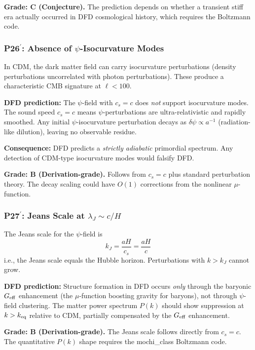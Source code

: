 \documentclass[11pt]{article}
\begin{document}
\textbf{Grade: C (Conjecture).}  The prediction depends on whether
a transient stiff era actually occurred in DFD cosmological history,
which requires the Boltzmann code.

\subsubsection{P26$^\prime$: Absence of $\psi$-Isocurvature Modes}

In CDM, the dark matter field can carry isocurvature perturbations
(density perturbations uncorrelated with photon perturbations).
These produce a characteristic CMB signature at $\ell < 100$.

\textbf{DFD prediction:} The $\psi$-field with $c_s = c$ does
\emph{not} support isocurvature modes.  The sound speed $c_s = c$
means $\psi$-perturbations are ultra-relativistic and
rapidly smoothed.  Any initial $\psi$-isocurvature perturbation
decays as $\delta\psi \propto a^{-1}$ (radiation-like dilution),
leaving no observable residue.

\textbf{Consequence:} DFD predicts a \emph{strictly adiabatic}
primordial spectrum.  Any detection of CDM-type isocurvature
modes would falsify DFD.

\textbf{Grade: B (Derivation-grade).}  Follows from $c_s = c$ plus
standard perturbation theory.  The decay scaling could have
$O(1)$ corrections from the nonlinear $\mu$-function.

\subsubsection{P27$^\prime$: Jeans Scale at $\lambda_J \sim c/H$}

The Jeans scale for the $\psi$-field is
\begin{equation}
k_J = \frac{aH}{c_s} = \frac{aH}{c}
\end{equation}
i.e., the Jeans scale equals the Hubble horizon.  Perturbations
with $k > k_J$ cannot grow.

\textbf{DFD prediction:} Structure formation in DFD occurs
\emph{only} through the baryonic $G_{\rm eff}$ enhancement
(the $\mu$-function boosting gravity for baryons), not through
$\psi$-field clustering.  The matter power spectrum $P(k)$ should
show suppression at $k > k_{\rm eq}$ relative to CDM, partially
compensated by the $G_{\rm eff}$ enhancement.

\textbf{Grade: B (Derivation-grade).}  The Jeans scale follows
directly from $c_s = c$.  The quantitative $P(k)$ shape requires
the mochi\_class Boltzmann code.
\end{document}
